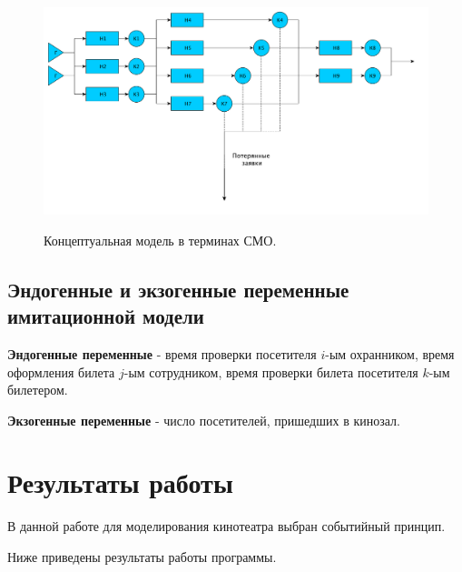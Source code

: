 \documentclass[a4paper,12pt]{article}
\begin{document}
	\begin{figure}[h!]
		\begin{center}
			{\includegraphics[scale = 0.4]{model.pdf}}
			\label{ris:model}
		\end{center}
		\caption{Концептуальная модель в терминах СМО.}
	\end{figure}
	
	\subsection*{Эндогенные и экзогенные переменные имитационной модели}
	
	{\bf Эндогенные переменные} - время проверки посетителя $i$-ым охранником,
	время оформления билета $j$-ым сотрудником, время проверки билета посетителя $k$-ым билетером.
	
	{\bf Экзогенные переменные} - число посетителей, пришедших в кинозал.
	
	\newpage
	
	\section*{Результаты работы}
	
	В данной работе для моделирования кинотеатра выбран событийный принцип.
	
	Ниже приведены результаты работы программы.
	
\end{document}

